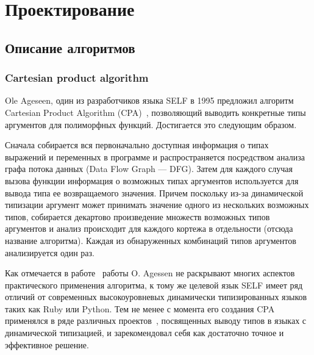 \chapter{Проектирование}

\section{Описание алгоритмов}

\subsection{Cartesian product algorithm}
\label{sub:CPA}

Ole Ageseen, один из разработчиков языка SELF в 1995 предложил алгоритм
Cartesian Product Algorithm (CPA)~\cite{Agesen1995}, позволяющий выводить
конкретные типы аргументов для полиморфных функций. Достигается это следующим
образом.

Сначала собирается вся первоначально доступная информация о типах выражений и
переменных в программе и распространяется посредством анализа графа потока
данных (Data Flow Graph --- DFG).  Затем для каждого случая вызова функции
информация о возможных типах аргументов используется для вывода типа ее
возвращаемого значения. Причем поскольку из-за динамической типизации аргумент
может принимать значение одного из нескольких возможных типов, собирается
декартово произведение множеств возможных типов аргументов и анализ происходит
для каждого кортежа в отдельности (отсюда название алгоритма). Каждая из
обнаруженных комбинаций типов аргументов анализируется один раз.

Как отмечается в работе~\cite{Madsen2007} работы O. Agessen не раскрывают
многих аспектов практического применения алгоритма, к тому же целевой язык SELF
имеет ряд отличий от современных высокоуровневых динамически типизированных
языков таких как Ruby или Python. Тем не менее с момента его создания CPA
применялся в ряде различных проектов~\cite{Madsen2007,Salib2004,Hanov},
посвященных выводу типов в языках с динамической типизацией, и зарекомендовал
себя как достаточно точное и эффективное решение.
